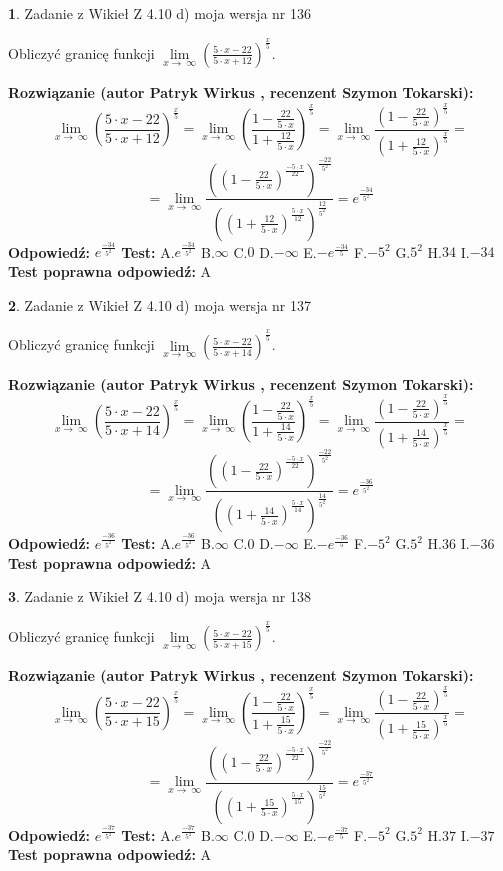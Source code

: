 \documentclass[12pt, a4paper]{article}
\theoremstyle{definition} %
\newtheorem{zad}{}
\newcommand{\zadStart}[1]{\begin{zad}#1\newline}
\newcommand{\zadStop}{\end{zad}}
\newcommand{\rozwStart}[2]{\noindent \textbf{Rozwiązanie (autor #1 , recenzent #2): }\newline}
\newcommand{\rozwStop}{\newline}
\newcommand{\odpStart}{\noindent \textbf{Odpowiedź:}\newline}
\newcommand{\odpStop}{\newline}
\newcommand{\testStart}{\noindent \textbf{Test:}\newline}
\newcommand{\testStop}{\newline}
\newcommand{\kluczStart}{\noindent \textbf{Test poprawna odpowiedź:}\newline}
\newcommand{\kluczStop}{\newline}
\begin{document}
\zadStart{Zadanie z Wikieł Z 4.10 d) moja wersja nr 136}


Obliczyć granicę funkcji  $\lim\limits_{x\to\ \infty}(\frac{5\cdot x-22}{5\cdot x+12})^{\frac{x}{5}}$.
\zadStop
\rozwStart{Patryk Wirkus}{Szymon Tokarski}
$$\lim\limits_{x\to\ \infty}(\frac{5\cdot x-22}{5\cdot x+12})^{\frac{x}{5}} = \lim\limits_{x\to\ \infty}(\frac{1-\frac{22}{5\cdot x}}{1+\frac{12}{5\cdot x}})^{\frac{x}{5}}=\lim\limits_{x\to\ \infty}\frac{(1-\frac{22}{5\cdot x})^{\frac{x}{5}}}{(1+\frac{12}{5\cdot x})^{\frac{x}{5}}}=$$
$$=\lim\limits_{x\to\ \infty}\frac{((1-\frac{22}{5\cdot x})^{\frac{-5\cdot x}{22}})^{\frac{-22}{5^{2}}}}{((1+\frac{12}{5\cdot x})^{\frac{5\cdot x}{12}})^{\frac{12}{5^{2}}}}=e^{\frac{-34}{5^{2}}}$$
\rozwStop
\odpStart
$e^{\frac{-34}{5^{2}}}$
\odpStop
\testStart
A.$e^{\frac{-34}{5^{2}}}$ B.$\infty$ C.$0$ D.$-\infty$ E.$-e^{\frac{-34}{5}}$
F.$-5^{2}$ G.$5^{2}$
H.$34$
I.$-34$
\testStop
\kluczStart
A
\kluczStop



\zadStart{Zadanie z Wikieł Z 4.10 d) moja wersja nr 137}


Obliczyć granicę funkcji  $\lim\limits_{x\to\ \infty}(\frac{5\cdot x-22}{5\cdot x+14})^{\frac{x}{5}}$.
\zadStop
\rozwStart{Patryk Wirkus}{Szymon Tokarski}
$$\lim\limits_{x\to\ \infty}(\frac{5\cdot x-22}{5\cdot x+14})^{\frac{x}{5}} = \lim\limits_{x\to\ \infty}(\frac{1-\frac{22}{5\cdot x}}{1+\frac{14}{5\cdot x}})^{\frac{x}{5}}=\lim\limits_{x\to\ \infty}\frac{(1-\frac{22}{5\cdot x})^{\frac{x}{5}}}{(1+\frac{14}{5\cdot x})^{\frac{x}{5}}}=$$
$$=\lim\limits_{x\to\ \infty}\frac{((1-\frac{22}{5\cdot x})^{\frac{-5\cdot x}{22}})^{\frac{-22}{5^{2}}}}{((1+\frac{14}{5\cdot x})^{\frac{5\cdot x}{14}})^{\frac{14}{5^{2}}}}=e^{\frac{-36}{5^{2}}}$$
\rozwStop
\odpStart
$e^{\frac{-36}{5^{2}}}$
\odpStop
\testStart
A.$e^{\frac{-36}{5^{2}}}$ B.$\infty$ C.$0$ D.$-\infty$ E.$-e^{\frac{-36}{5}}$
F.$-5^{2}$ G.$5^{2}$
H.$36$
I.$-36$
\testStop
\kluczStart
A
\kluczStop



\zadStart{Zadanie z Wikieł Z 4.10 d) moja wersja nr 138}


Obliczyć granicę funkcji  $\lim\limits_{x\to\ \infty}(\frac{5\cdot x-22}{5\cdot x+15})^{\frac{x}{5}}$.
\zadStop
\rozwStart{Patryk Wirkus}{Szymon Tokarski}
$$\lim\limits_{x\to\ \infty}(\frac{5\cdot x-22}{5\cdot x+15})^{\frac{x}{5}} = \lim\limits_{x\to\ \infty}(\frac{1-\frac{22}{5\cdot x}}{1+\frac{15}{5\cdot x}})^{\frac{x}{5}}=\lim\limits_{x\to\ \infty}\frac{(1-\frac{22}{5\cdot x})^{\frac{x}{5}}}{(1+\frac{15}{5\cdot x})^{\frac{x}{5}}}=$$
$$=\lim\limits_{x\to\ \infty}\frac{((1-\frac{22}{5\cdot x})^{\frac{-5\cdot x}{22}})^{\frac{-22}{5^{2}}}}{((1+\frac{15}{5\cdot x})^{\frac{5\cdot x}{15}})^{\frac{15}{5^{2}}}}=e^{\frac{-37}{5^{2}}}$$
\rozwStop
\odpStart
$e^{\frac{-37}{5^{2}}}$
\odpStop
\testStart
A.$e^{\frac{-37}{5^{2}}}$ B.$\infty$ C.$0$ D.$-\infty$ E.$-e^{\frac{-37}{5}}$
F.$-5^{2}$ G.$5^{2}$
H.$37$
I.$-37$
\testStop
\kluczStart
A
\kluczStop
\end{document}
